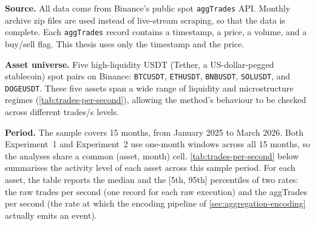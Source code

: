 \documentclass[11pt,titlepage,openany,oneside]{book}  %
\begin{document}
\textbf{Source.} All data come from Binance's public spot \texttt{aggTrades} API. Monthly archive zip files are used instead of live-stream scraping, so that the data is complete. Each \texttt{aggTrades} record contains a timestamp, a price, a volume, and a buy/sell flag. This thesis uses only the timestamp and the price.

\textbf{Asset universe.} Five high-liquidity USDT (Tether, a US-dollar-pegged stablecoin) spot pairs on Binance: \texttt{BTCUSDT}, \texttt{ETHUSDT}, \texttt{BNBUSDT}, \texttt{SOLUSDT}, and \texttt{DOGEUSDT}. These five assets span a wide range of liquidity and microstructure regimes (\cref{tab:trades-per-second}), allowing the method's behaviour to be checked across different trades/s levels.

\textbf{Period.} The sample covers 15 months, from January 2025 to March 2026. Both Experiment~1 and Experiment~2 use one-month windows across all 15 months, so the analyses share a common (asset, month) cell. \cref{tab:trades-per-second} below summarises the activity level of each asset across this sample period. For each asset, the table reports the median and the [5th, 95th] percentiles of two rates: the raw trades per second (one record for each raw execution) and the aggTrades per second (the rate at which the encoding pipeline of \cref{sec:aggregation-encoding} actually emits an event).
\end{document}
